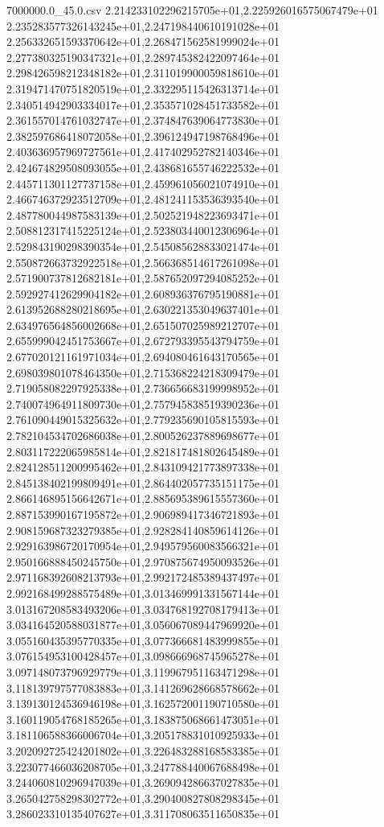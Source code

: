\begin{filecontents*}{7000000.0_45.0.csv}
2.214233102296215705e+01,2.225926016575067479e+01
2.235283577326143245e+01,2.247198440610191028e+01
2.256332651593370642e+01,2.268471562581999024e+01
2.277380325190347321e+01,2.289745382422097464e+01
2.298426598212348182e+01,2.311019900059818610e+01
2.319471470751820519e+01,2.332295115426313714e+01
2.340514942903334017e+01,2.353571028451733582e+01
2.361557014761032747e+01,2.374847639064773830e+01
2.382597686418072058e+01,2.396124947198768496e+01
2.403636957969727561e+01,2.417402952782140346e+01
2.424674829508093055e+01,2.438681655746222532e+01
2.445711301127737158e+01,2.459961056021074910e+01
2.466746372923512709e+01,2.481241153536393540e+01
2.487780044987583139e+01,2.502521948223693471e+01
2.508812317415225124e+01,2.523803440012306964e+01
2.529843190298390354e+01,2.545085628833021474e+01
2.550872663732922518e+01,2.566368514617261098e+01
2.571900737812682181e+01,2.587652097294085252e+01
2.592927412629904182e+01,2.608936376795190881e+01
2.613952688280218695e+01,2.630221353049637401e+01
2.634976564856002668e+01,2.651507025989212707e+01
2.655999042451753667e+01,2.672793395543794759e+01
2.677020121161971034e+01,2.694080461643170565e+01
2.698039801078464350e+01,2.715368224218309479e+01
2.719058082297925338e+01,2.736656683199998952e+01
2.740074964911809730e+01,2.757945838519390236e+01
2.761090449015325632e+01,2.779235690105815593e+01
2.782104534702686038e+01,2.800526237889698677e+01
2.803117222065985814e+01,2.821817481802645489e+01
2.824128511200995462e+01,2.843109421773897338e+01
2.845138402199809491e+01,2.864402057735151175e+01
2.866146895156642671e+01,2.885695389615557360e+01
2.887153990167195872e+01,2.906989417346721893e+01
2.908159687323279385e+01,2.928284140859614126e+01
2.929163986720170954e+01,2.949579560083566321e+01
2.950166888450245750e+01,2.970875674950093526e+01
2.971168392608213793e+01,2.992172485389437497e+01
2.992168499288575489e+01,3.013469991331567144e+01
3.013167208583493206e+01,3.034768192708179413e+01
3.034164520588031877e+01,3.056067089447969920e+01
3.055160435395770335e+01,3.077366681483999855e+01
3.076154953100428457e+01,3.098666968745965278e+01
3.097148073796929779e+01,3.119967951163471298e+01
3.118139797577083883e+01,3.141269628668578662e+01
3.139130124536946198e+01,3.162572001190710580e+01
3.160119054768185265e+01,3.183875068661473051e+01
3.181106588366006704e+01,3.205178831010925933e+01
3.202092725424201802e+01,3.226483288168583385e+01
3.223077466036208705e+01,3.247788440067688498e+01
3.244060810296947039e+01,3.269094286637027835e+01
3.265042758298302772e+01,3.290400827808298345e+01
3.286023310135407627e+01,3.311708063511650835e+01

\end{filecontents*}
